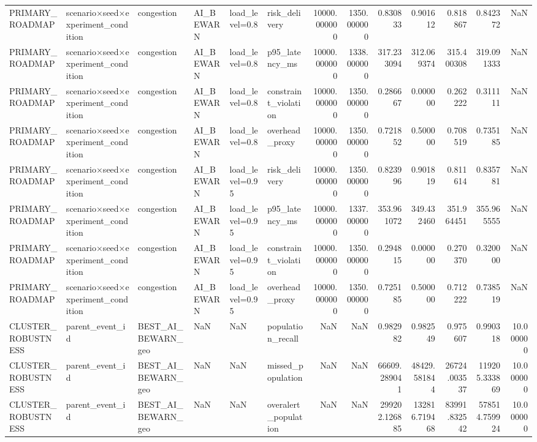 \begin{tabular}{llllllrrrrrrr}
PRIMARY\_ROADMAP & scenario×seed×experiment\_condition & congestion & AI\_BEWARN & load\_level=0.8 & risk\_delivery & 10000.000000 & 1350.000000 & 0.830833 & 0.901612 & 0.818867 & 0.842372 & NaN \\
PRIMARY\_ROADMAP & scenario×seed×experiment\_condition & congestion & AI\_BEWARN & load\_level=0.8 & p95\_latency\_ms & 10000.000000 & 1338.000000 & 317.233094 & 312.069374 & 315.400308 & 319.091333 & NaN \\
PRIMARY\_ROADMAP & scenario×seed×experiment\_condition & congestion & AI\_BEWARN & load\_level=0.8 & constraint\_violation & 10000.000000 & 1350.000000 & 0.286667 & 0.000000 & 0.262222 & 0.311111 & NaN \\
PRIMARY\_ROADMAP & scenario×seed×experiment\_condition & congestion & AI\_BEWARN & load\_level=0.8 & overhead\_proxy & 10000.000000 & 1350.000000 & 0.721852 & 0.500000 & 0.708519 & 0.735185 & NaN \\
PRIMARY\_ROADMAP & scenario×seed×experiment\_condition & congestion & AI\_BEWARN & load\_level=0.95 & risk\_delivery & 10000.000000 & 1350.000000 & 0.823996 & 0.901819 & 0.811614 & 0.835781 & NaN \\
PRIMARY\_ROADMAP & scenario×seed×experiment\_condition & congestion & AI\_BEWARN & load\_level=0.95 & p95\_latency\_ms & 10000.000000 & 1337.000000 & 353.961072 & 349.432460 & 351.964451 & 355.965555 & NaN \\
PRIMARY\_ROADMAP & scenario×seed×experiment\_condition & congestion & AI\_BEWARN & load\_level=0.95 & constraint\_violation & 10000.000000 & 1350.000000 & 0.294815 & 0.000000 & 0.270370 & 0.320000 & NaN \\
PRIMARY\_ROADMAP & scenario×seed×experiment\_condition & congestion & AI\_BEWARN & load\_level=0.95 & overhead\_proxy & 10000.000000 & 1350.000000 & 0.725185 & 0.500000 & 0.712222 & 0.738519 & NaN \\
CLUSTER\_ROBUSTNESS & parent\_event\_id & BEST\_AI\_BEWARN\_geo & NaN & NaN & population\_recall & NaN & NaN & 0.982982 & 0.982549 & 0.975607 & 0.990318 & 10.000000 \\
CLUSTER\_ROBUSTNESS & parent\_event\_id & BEST\_AI\_BEWARN\_geo & NaN & NaN & missed\_population & NaN & NaN & 66609.289041 & 48429.581844 & 26724.003537 & 119205.333869 & 10.000000 \\
CLUSTER\_ROBUSTNESS & parent\_event\_id & BEST\_AI\_BEWARN\_geo & NaN & NaN & overalert\_population & NaN & NaN & 299202.126885 & 132816.719468 & 83991.832542 & 578514.759924 & 10.000000 \\

\end{tabular}
